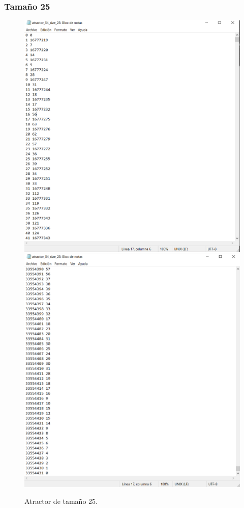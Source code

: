 \documentclass[11pt]{article}
\begin{document}
			\subsubsection{Tamaño 25}
			\begin{figure}[H]
			\centering
			\includegraphics[scale=0.3]{resources/Atractores54/atractor_54_size_25.png}
			\includegraphics[scale=0.3]{resources/Atractores54/atractor_54_size_251.png}
			\caption{Atractor de tamaño 25.}\label{fig:picture}
			\end{figure}
\end{document}
